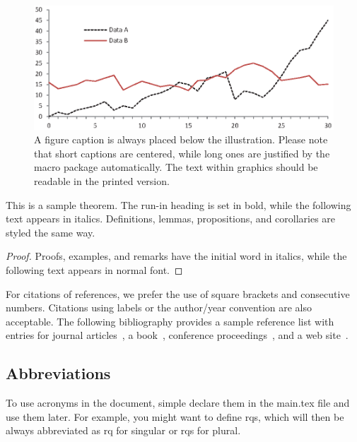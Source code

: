 \begin{figure}
\includegraphics[width=\textwidth]{figures/fig1}
\caption{A figure caption is always placed below the illustration.
Please note that short captions are centered, while long ones are justified by the macro package automatically. The text within graphics should be readable in the printed version.} 
\label{fig:fig1}
\end{figure}

\begin{theorem}
This is a sample theorem. 
The run-in heading is set in bold, while the following text appears in italics. 
Definitions, lemmas, propositions, and corollaries are styled the same way.
\end{theorem}
%
%
\begin{proof}
Proofs, examples, and remarks have the initial word in italics, while the following text appears in normal font.
\end{proof}
For citations of references, we prefer the use of square brackets and consecutive numbers. 
Citations using labels or the author/year convention are also acceptable. 
The following bibliography provides a sample reference list with entries for journal articles~\cite{Stol2016}, a book~\cite{Myers2012}, conference proceedings~\cite{Harrold1988}, and a web site~\cite{Schaffer2018}.

\subsection{Abbreviations}
\label{subsec:abbrev}

To use acronyms in the document, simple declare them in the main.tex file and use them later.
For example, you might want to define \acp{rq}, which will then be always abbreviated as \ac{rq} for singular or \acp{rq} for plural.

